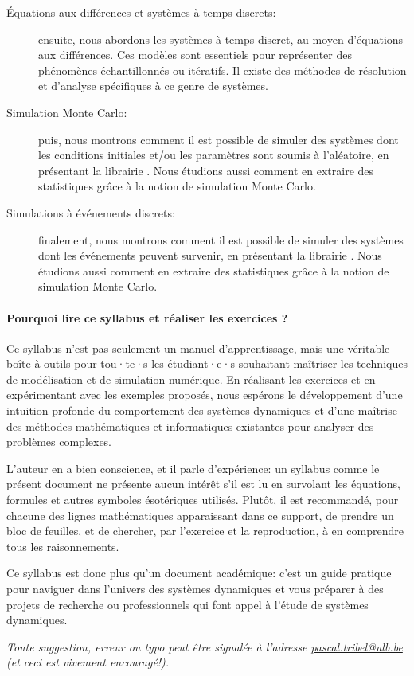 \begin{description}
        \item[Équations aux différences et systèmes à temps discrets:] ensuite, nous abordons  les systèmes à temps discret, au moyen d'équations aux différences. Ces modèles sont essentiels pour représenter des phénomènes échantillonnés ou itératifs.  Il existe des méthodes de résolution et d'analyse spécifiques à ce genre de systèmes.
        \item[Simulation Monte Carlo:] puis, nous montrons comment il est possible de simuler des systèmes dont les conditions initiales et/ou les paramètres sont soumis à l'aléatoire, en présentant la librairie . Nous étudions aussi comment en extraire des statistiques grâce à la notion de simulation Monte Carlo.
        \item[Simulations à événements discrets:] finalement, nous montrons comment il est possible de simuler des systèmes dont les événements peuvent survenir, en présentant la librairie . Nous étudions aussi comment en extraire des statistiques grâce à la notion de simulation Monte Carlo.
    \end{description}

    \paragraph{Pourquoi lire ce syllabus et réaliser les exercices ?}
    
    Ce syllabus n'est pas seulement un manuel d'apprentissage, mais une véritable boîte à outils pour tou·te·s les étudiant·e·s souhaitant maîtriser les techniques de modélisation et de simulation numérique. En réalisant les exercices et en expérimentant avec les exemples proposés, nous espérons le développement d'une intuition profonde du comportement des systèmes dynamiques et d'une maîtrise des méthodes mathématiques et informatiques existantes pour analyser des problèmes complexes. 

    L'auteur en a bien conscience, et il parle d'expérience: un syllabus comme le présent document ne présente aucun intérêt s'il est lu en survolant les équations, formules et autres symboles ésotériques utilisés. Plutôt, il est recommandé, pour chacune des lignes mathématiques apparaissant dans ce support, de prendre un bloc de feuilles, et de chercher, par l'exercice et la reproduction, à en comprendre tous les raisonnements. 

    Ce syllabus est donc plus qu’un document académique: c’est un guide pratique pour naviguer dans l’univers des systèmes dynamiques et vous préparer à des projets de recherche ou professionnels qui font appel à l'étude de systèmes dynamiques.

    \textit{Toute suggestion, erreur ou typo peut être signalée à l'adresse \href{mailto:pascal.tribel@ulb.be}{pascal.tribel@ulb.be} (et ceci est vivement encouragé!).}